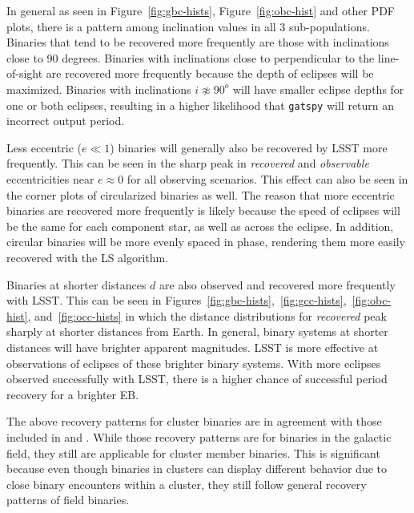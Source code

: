 \documentclass[twocolumn]{aastex63}
\begin{document}
In general as seen in Figure~\ref{fig:gbc-hists}, Figure~\ref{fig:obc-hist} and other PDF plots, there is a pattern among inclination values in all 3 sub-populations. Binaries that tend to be recovered more frequently are those with inclinations close to 90 degrees. Binaries with inclinations close to perpendicular to the line-of-sight are recovered more frequently because the depth of eclipses will be maximized. Binaries with inclinations $i \not\approx 90^o$ will have smaller eclipse depths for one or both eclipses, resulting in a higher likelihood that \texttt{gatspy} will return an incorrect output period.

Less eccentric ($e \ll 1$) binaries will generally also be recovered by LSST more frequently. This can be seen in the sharp peak in \textit{recovered} and \textit{observable} eccentricities near $e \approx 0$ for all observing scenarios. This effect can also be seen in the corner plots of circularized binaries as well. The reason that more eccentric binaries are recovered more frequently is likely because the speed of eclipses will be the same for each component star, as well as across the eclipse. In addition, circular binaries will be more evenly spaced in phase, rendering them more easily recovered with the LS algorithm.

Binaries at shorter distances $d$  are also observed and recovered more frequently with LSST. This can be seen in Figures~\ref{fig:gbc-hists},~\ref{fig:gcc-hists},~\ref{fig:obc-hist}, and~\ref{fig:occ-hists} in which the distance distributions for \textit{recovered} peak sharply at shorter distances from Earth. In general, binary systems at shorter distances will have brighter apparent magnitudes. LSST is more effective at observations of eclipses of these brighter binary systems. With more eclipses observed successfully with LSST, there is a higher chance of successful period recovery for a brighter EB. 

The above recovery patterns for cluster binaries are in agreement with those included in \citet{2019AAS...23336317P} and \citet{2011AJ....142...52P}. While those recovery patterns are for binaries in the galactic field, they still are applicable for cluster member binaries. This is significant because even though binaries in clusters can display different behavior due to close binary encounters within a cluster, they still follow general recovery patterns of field binaries. 
\end{document}
